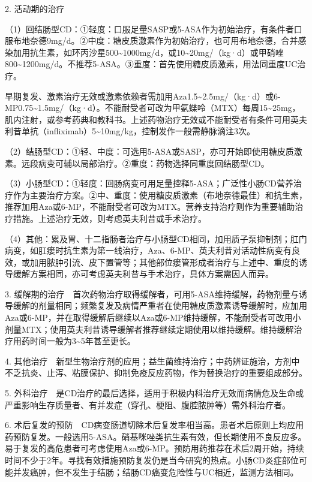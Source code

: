 2. 活动期的治疗

（1）回结肠型CD：①轻度：口服足量SASP或5-ASA作为初始治疗，有条件者口服布地奈德9mg/d。②中度：糖皮质激素作为初始治疗，也可用布地奈德，合并感染加用抗生素，如环丙沙星500\textasciitilde{}1000mg/d，或10\textasciitilde{}20mg/（kg·d）或甲硝唑800\textasciitilde{}1200mg/d。不推荐5-ASA。③重度：首先使用糖皮质激素，用法同重度UC治疗。

早期复发、激素治疗无效或激素依赖者需加用Aza1.5\textasciitilde{}2.5mg/（kg·d）或6-MP0.75\textasciitilde{}1.5mg/（kg·d）。不能耐受者可改为甲氨蝶呤（MTX）每周15\textasciitilde{}25mg，肌内注射，或参考药典和教科书。上述药物治疗无效或不能耐受者有条件可用英夫利昔单抗（infliximab）5\textasciitilde{}10mg/kg，控制发作一般需静脉滴注3次。

（2）结肠型CD：①轻、中度：可选用5-ASA或SASP，亦可开始即使用糖皮质激素。远段病变可辅以局部治疗。②重度：药物选择同重度回结肠型CD。

（3）小肠型CD：①轻度：回肠病变可用足量控释5-ASA；广泛性小肠CD营养治疗作为主要治疗方案。②中、重度：使用糖皮质激素（布地奈德最佳）和抗生素，推荐加用Aza或6-MP，不能耐受者可改为MTX。营养支持治疗则作为重要辅助治疗措施。上述治疗无效，则考虑英夫利昔或手术治疗。

（4）其他：累及胃、十二指肠者治疗与小肠型CD相同，加用质子泵抑制剂；肛门病变，如肛瘘时抗生素为第一线治疗，Aza、6-MP、英夫利昔对活动性病变有良效，或加用脓肿引流、皮下置管等；其他部位瘘管形成者治疗与上述中、重度的诱导缓解方案相同，亦可考虑英夫利昔与手术治疗，具体方案需因人而异。

3.
缓解期的治疗　首次药物治疗取得缓解者，可用5-ASA维持缓解，药物剂量与诱导缓解的剂量相同；频繁复发及病情严重者在使用糖皮质激素诱导缓解时，应加用Aza或6-MP，并在取得缓解后继续以Aza或6-MP维持缓解，不能耐受者可改用小剂量MTX；使用英夫利昔诱导缓解者推荐继续定期使用以维持缓解。维持缓解治疗用药时间一般为3\textasciitilde{}5年甚至更长。

4.
其他治疗　新型生物治疗剂的应用；益生菌维持治疗；中药辨证施治，方剂中不乏抗炎、止泻、粘膜保护、抑制免疫反应药物，作为替换治疗的重要组成部分。

5.
外科治疗　是CD治疗的最后选择，适用于积极内科治疗无效而病情危及生命或严重影响生存质量者、有并发症（穿孔、梗阻、腹腔脓肿等）需外科治疗者。

6.
术后复发的预防　CD病变肠道切除术后复发率相当高。患者术后原则上均应用药预防复发。一般选用5-ASA。硝基咪唑类抗生素有效，但长期使用不良反应多。易于复发的高危患者可考虑使用Aza或6-MP。预防用药推荐在术后2周开始，持续时间不少于2年。寻找有效措施预防复发仍是当今研究的热点。小肠CD炎症部位可能并发癌肿，但不发生于结肠；结肠CD癌变危险性与UC相近，监测方法相同。

